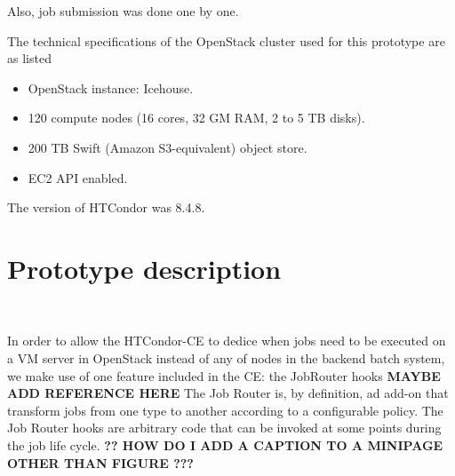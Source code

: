 \documentclass[a4paper]{jpconf}
\begin{document}
Also, job submission was done one by one.

The technical specifications of the OpenStack cluster used for this prototype are as listed 

\begin{itemize}
\item OpenStack instance: Icehouse.
\item 120 compute nodes (16 cores, 32 GM RAM, 2 to 5 TB disks).
\item 200 TB Swift (Amazon S3-equivalent) object store.
\item EC2 API enabled.
\end{itemize}

The version of HTCondor was 8.4.8.


\section{Prototype description}

~

In order to allow the HTCondor-CE to dedice when jobs need to be executed on a VM server in OpenStack 
instead of any of nodes in the backend batch system,
we make use of one feature included in the CE: the JobRouter hooks \textbf{MAYBE ADD REFERENCE HERE} \newline
The Job Router is, by definition, ad add-on that transform jobs from one type to another according to a configurable policy. 
The Job Router hooks are arbitrary code that can be invoked at some points during the job life cycle.
\newline \textbf{?? HOW DO I ADD A CAPTION TO A MINIPAGE OTHER THAN FIGURE ???}

\end{document}
